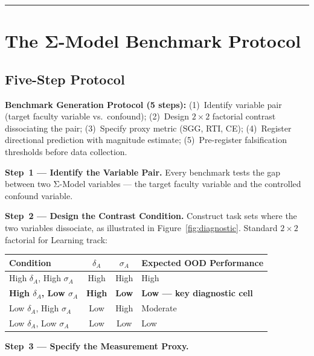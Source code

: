 \documentclass[10pt]{article}
\begin{document}
\noindent\rule{\linewidth}{0.4pt}

\section{The Σ-Model Benchmark Protocol}\label{sec:benchmark-protocol}

\subsection{Five-Step Protocol}\label{sec:five-step}

\textbf{Benchmark Generation Protocol (5 steps):}
(1)~Identify variable pair (target faculty variable vs.\ confound);
(2)~Design $2{\times}2$ factorial contrast dissociating the pair;
(3)~Specify proxy metric (SGG, RTI, CE);
(4)~Register directional prediction with magnitude estimate;
(5)~Pre-register falsification thresholds before data collection.

\textbf{Step~1 --- Identify the Variable Pair.} Every benchmark tests
the gap between two Σ-Model variables --- the target faculty variable and
the controlled confound variable.

\textbf{Step~2 --- Design the Contrast Condition.} Construct task sets
where the two variables dissociate, as illustrated in Figure~\ref{fig:diagnostic}. Standard $2\times 2$ factorial for
Learning track:



\begin{center}
\begin{tabular}{>{\raggedright}p{4cm} c c >{\raggedright\arraybackslash}p{5cm}}
\toprule
\textbf{Condition} & $\delta_A$ & $\sigma_A$ & \textbf{Expected OOD Performance} \\
\midrule
High $\delta_A$, High $\sigma_A$ & High & High & High \\
\textbf{High $\delta_A$, Low $\sigma_A$} & \textbf{High} & \textbf{Low} & \textbf{Low --- key diagnostic cell} \\
Low $\delta_A$, High $\sigma_A$ & Low & High & Moderate \\
Low $\delta_A$, Low $\sigma_A$ & Low & Low & Low \\
\bottomrule
\end{tabular}
\end{center}

\textbf{Step~3 --- Specify the Measurement Proxy.}
\end{document}

